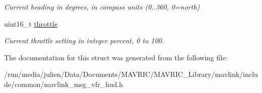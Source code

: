 \begin{DoxyCompactItemize}
\begin{DoxyCompactList}\small\item\em Current heading in degrees, in compass units (0..360, 0=north) \end{DoxyCompactList}\item 
\hypertarget{struct____mavlink__vfr__hud__t_ae73bae71b52e32eb61edb4fbccac319c}{uint16\+\_\+t \hyperlink{struct____mavlink__vfr__hud__t_ae73bae71b52e32eb61edb4fbccac319c}{throttle}}\label{struct____mavlink__vfr__hud__t_ae73bae71b52e32eb61edb4fbccac319c}

\begin{DoxyCompactList}\small\item\em Current throttle setting in integer percent, 0 to 100. \end{DoxyCompactList}\end{DoxyCompactItemize}


The documentation for this struct was generated from the following file\+:\begin{DoxyCompactItemize}
\item 
/run/media/julien/\+Data/\+Documents/\+M\+A\+V\+R\+I\+C/\+M\+A\+V\+R\+I\+C\+\_\+\+Library/mavlink/include/common/mavlink\+\_\+msg\+\_\+vfr\+\_\+hud.\+h\end{DoxyCompactItemize}
